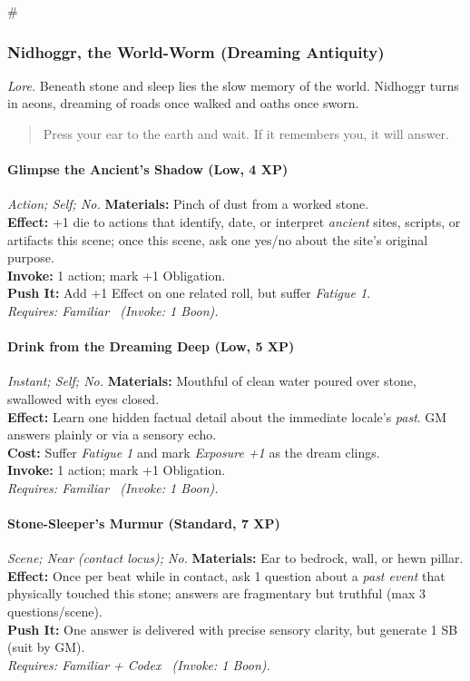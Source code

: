 # %

\subsubsection{Nidhoggr, the World-Worm (Dreaming Antiquity)}
\textit{Lore.} Beneath stone and sleep lies the slow memory of the world. Nidhoggr turns in aeons, dreaming of roads once walked and oaths once sworn.

\begin{quote}
Press your ear to the earth and wait. If it remembers you, it will answer.
\end{quote}

\paragraph*{Glimpse the Ancient's Shadow (Low, 4 XP)} \emph{Action; Self; No.}
\textbf{Materials:} Pinch of dust from a worked stone.\\
\textbf{Effect:} +1 die to actions that identify, date, or interpret \emph{ancient} sites, scripts, or artifacts this scene; once this scene, ask one yes/no about the site's original purpose.\\
\textbf{Invoke:} 1 action; mark +1 Obligation.\\
\textbf{Push It:} Add +1 Effect on one related roll, but suffer \emph{Fatigue 1}.\\
\emph{Requires: Familiar \ (\textit{Invoke:} 1 Boon).}

\paragraph*{Drink from the Dreaming Deep (Low, 5 XP)} \emph{Instant; Self; No.}
\textbf{Materials:} Mouthful of clean water poured over stone, swallowed with eyes closed.\\
\textbf{Effect:} Learn one hidden factual detail about the immediate locale's \emph{past}. GM answers plainly or via a sensory echo.\\
\textbf{Cost:} Suffer \emph{Fatigue 1} and mark \emph{Exposure +1} as the dream clings.\\
\textbf{Invoke:} 1 action; mark +1 Obligation.\\
\emph{Requires: Familiar \ (\textit{Invoke:} 1 Boon).}

\paragraph{Stone-Sleeper's Murmur (Standard, 7 XP)} \emph{Scene; Near (contact locus); No.}
\textbf{Materials:} Ear to bedrock, wall, or hewn pillar.\\
\textbf{Effect:} Once per beat while in contact, ask 1 question about a \emph{past event} that physically touched this stone; answers are fragmentary but truthful (max 3 questions/scene).\\
\textbf{Push It:} One answer is delivered with precise sensory clarity, but generate 1 SB (suit by GM).\\
\emph{Requires: Familiar + Codex \ (\textit{Invoke:} 1 Boon).}

